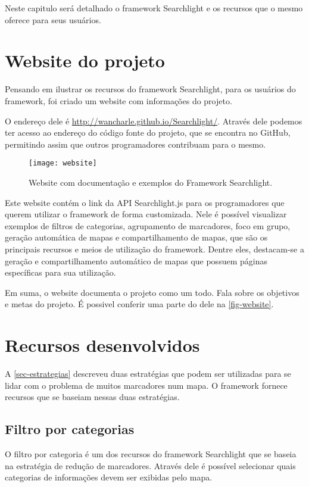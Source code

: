 Neste capitulo será detalhado o framework Searchlight e os recursos que o mesmo oferece para seus usuários.

\section{Website do projeto}
Pensando em ilustrar os recursos do framework Searchlight, para os usuários do framework, foi criado um website com informações do projeto.

O endereço dele é \url{http://wancharle.github.io/Searchlight/}. Através dele podemos ter acesso ao endereço do código fonte do projeto, que se encontra no GitHub, permitindo assim que outros programadores contribuam para o mesmo.

\begin{figure}[htb]
	\caption{\label{fig-website}Website com documentação e exemplos do Framework Searchlight.}
	\begin{center}
	    \texttt{[image: website]}
	\end{center}
\end{figure}


Este website contém o link da API Searchlight.js para os programadores que querem utilizar o framework de forma customizada. Nele é possível visualizar exemplos de filtros de categorias, agrupamento de marcadores, foco em grupo, geração automática de mapas e compartilhamento de mapas, que são os principais recursos e meios de utilização do framework. Dentre eles, destacam-se a geração e compartilhamento automático de mapas que possuem páginas específicas para sua utilização. 


Em suma, o website documenta o projeto como um todo. Fala sobre os objetivos e metas do projeto. É possivel conferir uma parte do dele na \autoref{fig-website}. 

\section{Recursos desenvolvidos}
A \autoref{sec-estrategias} descreveu duas estratégias que podem ser utilizadas para se lidar com o problema de muitos marcadores num mapa. O framework fornece recursos que se baseiam nessas duas estratégias. 

\subsection{Filtro por categorias}
O filtro por categoria é um dos recursos do framework Searchlight que se baseia na estratégia de redução de marcadores. Através dele é possível selecionar quais categorias de informações devem ser exibidas pelo mapa. 

